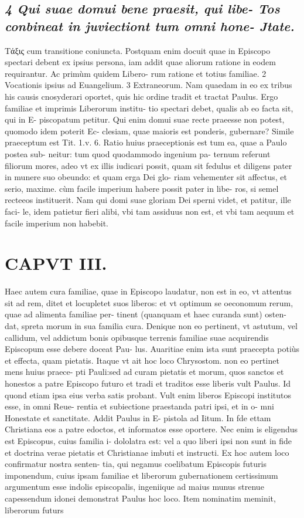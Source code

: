 \documentclass{article}
\begin{document}
\begin{pages}
\subsection*{\textit{4 Qui suae domui bene praesit, qui libe- Tos conbineat in juviectiont tum omni hone- Jtate. }}\pstart Τάξις cum transitione coniuncta. Postquam enim docuit quae in Episcopo spectari debent ex ipsius persona, iam addit quae aliorum ratione in eodem requirantur. Ac primùm quidem Libero- rum ratione et totius familiae. 2 Vocationis ipsius ad Euangelium. 3 Extraneorum. Nam quaedam in eo ex tribus his causis cnosyderari oportet, quis hic ordine tradit et tractat Paulus.  \pend\pstart Ergo familiae et imprimis Liberorum institu- tio spectari debet, qualis ab eo facta sit, qui in E- piscopatum petitur. Qui enim domui suae recte praeesse non potest, quomodo idem poterit Ec- clesiam, quae maioris est ponderis, gubernare?  \pend\pstart Simile praeceptum est Tit. 1.v. 6. Ratio huius praeceptionis est tum ea, quae a Paulo postea sub- neitur: tum quod quodammodo ingenium pa- ternum referunt filiorum mores, adeo vt ex illis iudicari possit, quam sit fedulus et diligens pater in munere suo obeundo: et quam erga Dei glo- riam vehementer sit affectus, et serio, maxime. cùm facile imperium habere possit pater in libe- ros, si semel recteeos instituerit. Nam qui domi suae gloriam Dei sperni videt, et patitur, ille faci- le, idem patietur fieri alibi, vbi tam assiduus non est, et vbi tam aequum et facile imperium non habebit.  \pend
\section*{CAPVT  III. }
\marginpar{[ p.14t ]}\pstart Haec autem cura familiae, quae in Episcopo laudatur, non est in eo, vt attentus sit ad rem, ditet et locupletet suos liberos: et vt optimum se oeconomum rerum, quae ad alimenta familiae per- tinent (quanquam et haec curanda sunt) osten- dat, spreta morum in sua familia cura. Denique non eo pertinent, vt astutum, vel callidum, vel addictum bonis opibusque terrenis familiae suae acquirendis Episcopum esse debere doceat Pau- lus. Auaritiae enim ista sunt praecepta potiùs et effecta, quam pietatis. Itaque vt ait hoc loco Chrysostom. non eo pertinet mens huius praece- pti Pauli:sed ad curam pietatis et morum, quos sanctos et honestos a patre Episcopo futuro et tradi et traditos esse liberis vult Paulus. Id quond etiam ipsa eius verba satis probant. Vult enim liberos Episcopi institutos esse, in omni Reue- rentia et subiectione praestanda patri ipsi, et in o- mni Honestate et sanctitate. Addit Paulus in E- pistola ad Iitum. In fde ettam Christiana eos a patre edoctos, et informatos esse oportere. Nec enim is eligendus est Episcopus, cuius familia i- dololatra est: vel a quo liberi ipsi non sunt in fide et doctrina verae pietatis et Christianae imbuti et instructi.  \pend\pstart Ex hoc autem loco confirmatur nostra senten- tia, qui negamus coelibatum Episcopis futuris imponendum, cuius ipsam familiae et liberorum gubernationem certissimum argumentum esse indolis episcopalis, ingeniique ad maius munus strenue capessendum idonei demonstrat Paulus hoc loco.  \pend\pstart Item nominatim meminit, liberorum futurs  \pend

\end{pages}
\end{document}
